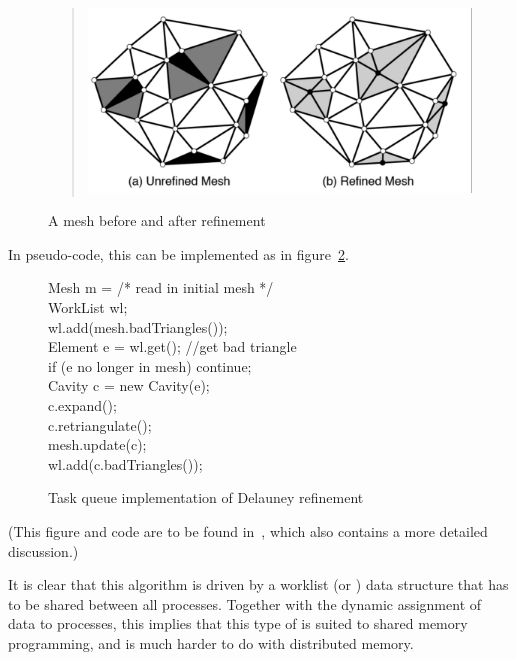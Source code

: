 \begin{figure}[ht]
    \begin{quote}
\includegraphics[scale=.15]{graphics-public/delauneypdf}
        \end{quote}
  \caption{A mesh before and after refinement}
  \label{fig:delauney}
\end{figure}

In pseudo-code, this can be implemented as in
figure~\ref{fig:delauney-code}.
\begin{figure}
\begin{displayalgorithm}
Mesh m = /* read in initial mesh */ \\
WorkList wl; \\
wl.add(mesh.badTriangles()); \\
 { 
Element e = wl.get(); //get bad triangle \\
if (e no longer in mesh) continue; \\
Cavity c = new Cavity(e); \\
c.expand(); \\
c.retriangulate(); \\
mesh.update(c); \\
wl.add(c.badTriangles()); \\
}
\end{displayalgorithm}
  \caption{Task queue implementation of Delauney refinement}
  \label{fig:delauney-code}
\end{figure}
(This figure and code are to be found in~\cite{Kulkami:howmuch}, 
which also contains a more detailed discussion.)


It is clear that this algorithm is driven by a worklist (or
) data structure
that has to be shared between all processes. Together with the dynamic
assignment of data to processes, this implies that this type of
 is suited to shared memory
programming, and is much harder to do with distributed memory.

